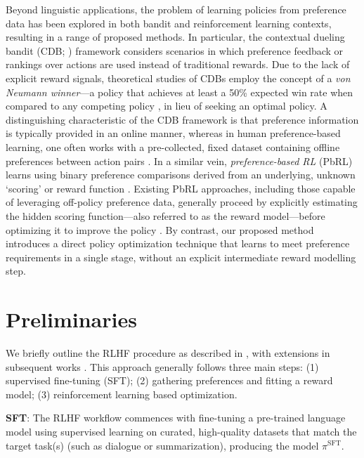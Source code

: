 Beyond linguistic applications, the problem of learning policies from preference data has been explored in both bandit and reinforcement learning contexts, resulting in a range of proposed methods. In particular, the contextual dueling bandit (CDB; \cite{yue2012karmed,dudik2015contextual}) framework considers scenarios in which preference feedback or rankings over actions are used instead of traditional rewards. Due to the lack of explicit reward signals, theoretical studies of CDBs employ the concept of a \textit{von Neumann winner}—a policy that achieves at least a 50\% expected win rate when compared to any competing policy \citep{dudik2015contextual}, in lieu of seeking an optimal policy. A distinguishing characteristic of the CDB framework is that preference information is typically provided in an online manner, whereas in human preference-based learning, one often works with a pre-collected, fixed dataset containing offline preferences between action pairs \citep{yan2022human}. In a similar vein, \textit{preference-based RL} (PbRL) learns using binary preference comparisons derived from an underlying, unknown ‘scoring’ or reward function \citep{BusaFekete2014,ruiz2023dueling}. Existing PbRL approaches, including those capable of leveraging off-policy preference data, generally proceed by explicitly estimating the hidden scoring function—also referred to as the reward model—before optimizing it to improve the policy \citep{jain2013learning,BusaFekete2014,christiano2017deep,sadigh2017active,kupcsik2018learning}. By contrast, our proposed method introduces a direct policy optimization technique that learns to meet preference requirements in a single stage, without an explicit intermediate reward modelling step.

\section{Preliminaries}\label{section:prelims}

We briefly outline the RLHF procedure as described in \citeauthor{ziegler2020finetuning}, with extensions in subsequent works \citep{stiennon2022learning, bai2022training, ouyang2022training}. This approach generally follows three main steps: (1) supervised fine-tuning (SFT); (2) gathering preferences and fitting a reward model; (3) reinforcement learning based optimization.

\textbf{SFT}: The RLHF workflow commences with fine-tuning a pre-trained language model using supervised learning on curated, high-quality datasets that match the target task(s) (such as dialogue or summarization), producing the model $\pi^\text{SFT}$.


